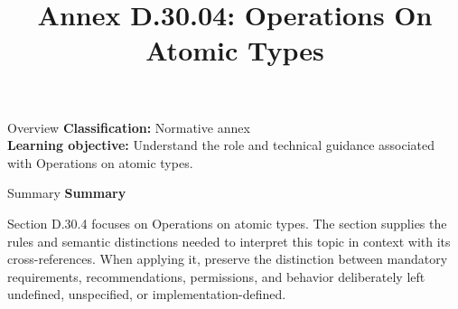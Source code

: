 \documentclass[10pt,letterpaper]{article}
\title{Annex D.30.04: Operations On Atomic Types}
\author{}
\date{}
\begin{document}
\maketitle
\begin{CornellOverviewBox}{Overview}
\textbf{Classification:} Normative annex\\[2pt]
\textbf{Learning objective:} Understand the role and technical guidance associated with Operations on atomic types.
\end{CornellOverviewBox}\begin{CornellSummaryBox}{Summary}
{\sffamily\bfseries\color{Accent} Summary}\par\vspace{3pt}Section D.30.4 focuses on Operations on atomic types. The section supplies the rules and semantic distinctions needed to interpret this topic in context with its cross-references. When applying it, preserve the distinction between mandatory requirements, recommendations, permissions, and behavior deliberately left undefined, unspecified, or implementation-defined.
\end{CornellSummaryBox}
\end{document}
